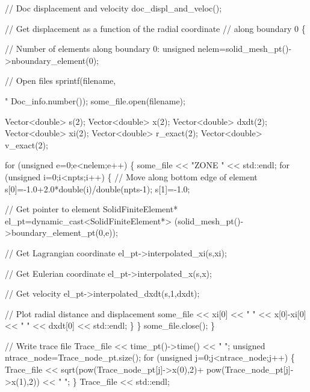 \begin{DoxyCodeInclude}
{{ \textcolor{comment}{// Doc displacement and velocity}
 doc\_displ\_and\_veloc();

 \textcolor{comment}{// Get displacement as a function of the radial coordinate}
 \textcolor{comment}{// along boundary 0}
 \{

  \textcolor{comment}{// Number of elements along boundary 0:}
  \textcolor{keywordtype}{unsigned} nelem=solid\_mesh\_pt()->nboundary\_element(0);

  \textcolor{comment}{// Open files}
  sprintf(filename,\textcolor{stringliteral}{"%
          Doc\_info.number());
  some\_file.open(filename);
  
  Vector<double> s(2);
  Vector<double> x(2);
  Vector<double> dxdt(2);
  Vector<double> xi(2);
  Vector<double> r\_exact(2);
  Vector<double> v\_exact(2);

  \textcolor{keywordflow}{for} (\textcolor{keywordtype}{unsigned} e=0;e<nelem;e++)
   \{
    some\_file << \textcolor{stringliteral}{"ZONE "} << std::endl;
    \textcolor{keywordflow}{for} (\textcolor{keywordtype}{unsigned} i=0;i<npts;i++)
     \{
      \textcolor{comment}{// Move along bottom edge of element}
      s[0]=-1.0+2.0*double(i)/double(npts-1);
      s[1]=-1.0;

      \textcolor{comment}{// Get pointer to element}
      SolidFiniteElement* el\_pt=\textcolor{keyword}{dynamic\_cast<}SolidFiniteElement*\textcolor{keyword}{>}
       (solid\_mesh\_pt()->boundary\_element\_pt(0,e));
      
      \textcolor{comment}{// Get Lagrangian coordinate}
      el\_pt->interpolated\_xi(s,xi);

      \textcolor{comment}{// Get Eulerian coordinate}
      el\_pt->interpolated\_x(s,x);

      \textcolor{comment}{// Get velocity }
      el\_pt->interpolated\_dxdt(s,1,dxdt);
  
      \textcolor{comment}{// Plot radial distance and displacement}
      some\_file << xi[0] << \textcolor{stringliteral}{" "} << x[0]-xi[0] << \textcolor{stringliteral}{" "} 
                << dxdt[0] << std::endl;
     \}
   \}
  some\_file.close(); 
 \}

  
 \textcolor{comment}{// Write trace file}
 Trace\_file << time\_pt()->time()  << \textcolor{stringliteral}{" "};
 \textcolor{keywordtype}{unsigned} ntrace\_node=Trace\_node\_pt.size();
 \textcolor{keywordflow}{for} (\textcolor{keywordtype}{unsigned} j=0;j<ntrace\_node;j++)
  \{
   Trace\_file << sqrt(pow(Trace\_node\_pt[j]->x(0),2)+
                      pow(Trace\_node\_pt[j]->x(1),2)) << \textcolor{stringliteral}{" "};
  \}
 Trace\_file << std::endl;


}}}
\end{DoxyCodeInclude}

